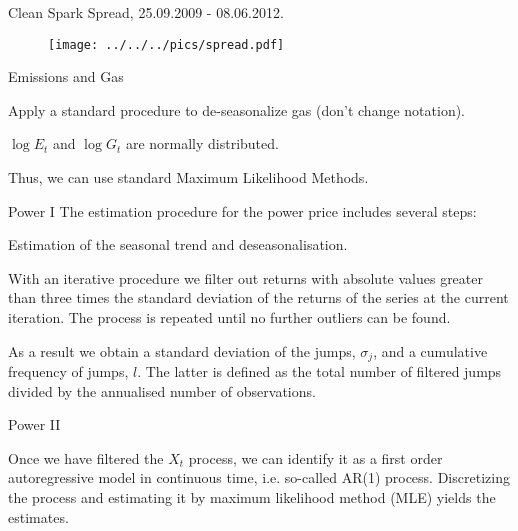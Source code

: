 {Clean Spark Spread, 25.09.2009 - 08.06.2012.}
\begin{figure}[htp]
\centering
\texttt{[image: ../../../pics/spread.pdf]}
\label{spread}
\end{figure}


{Emissions and Gas}
\item Apply a standard procedure to de-seasonalize gas (don't change notation).
\item $\log E_t$ and $\log G_t$ are normally distributed.
\item Thus, we can use standard Maximum Likelihood Methods.

{Power I}
The estimation procedure for the power price includes several steps:
\item Estimation of the seasonal trend and deseasonalisation.
\item With an iterative procedure we filter out returns with absolute values greater than three times the standard deviation of the returns of the series at the current iteration. The process is repeated until no further outliers can be found.
\item As a result we obtain a standard deviation of the jumps, $\sigma_j$, and a cumulative frequency of jumps, $l$. The latter is defined as the total number of filtered jumps divided by the annualised number of observations.

{Power II}
\item Once we have filtered the $X_t$ process, we can identify it as a first order autoregressive model in continuous time, i.e. so-called AR(1) process. Discretizing the process and estimating it by maximum likelihood method (MLE) yields the estimates.

